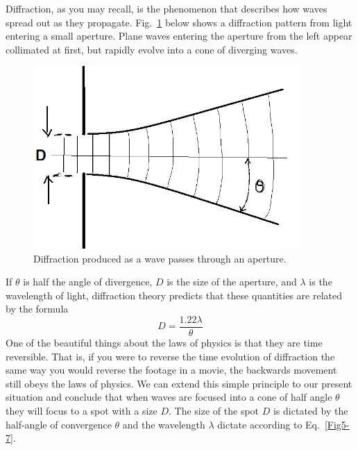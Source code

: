Diffraction, as you may recall, is the phenomenon that describes how waves spread out as they propagate.  Fig.~\ref{Fig5-12} below shows a diffraction pattern from light entering a small aperture.  Plane waves entering the aperture from the left appear collimated at first, but rapidly evolve into a cone of diverging waves.
\begin{figure}[h]
	\centering
	\includegraphics[width=4.0in]{./figures/Topic5/Fig5-12.png}
	\caption{Diffraction produced as a wave passes through an aperture.}
	\label{Fig5-12}
\end{figure}
If $\theta$ is half the angle of divergence, $D$ is the size of the aperture, and $\lambda$ is the wavelength of light, diffraction theory predicts that these quantities are related by the formula
\begin{equation}\label{eqn5-7}
D = \frac{1.22\lambda}{\theta}
\end{equation}
One of the beautiful things about the laws of physics is that they are time reversible. That is, if you were to reverse the time evolution of diffraction the same way you would reverse the footage in a movie, the backwards movement still obeys the laws of physics. We can extend this simple principle to our present situation and conclude that when waves are focused into a cone of half angle $\theta$ they will focus to a spot with a size $D$. The size of the spot $D$ is dictated by the half-angle of convergence $\theta$ and the wavelength $\lambda$ dictate according to Eq.~\ref{Fig5-7}.

